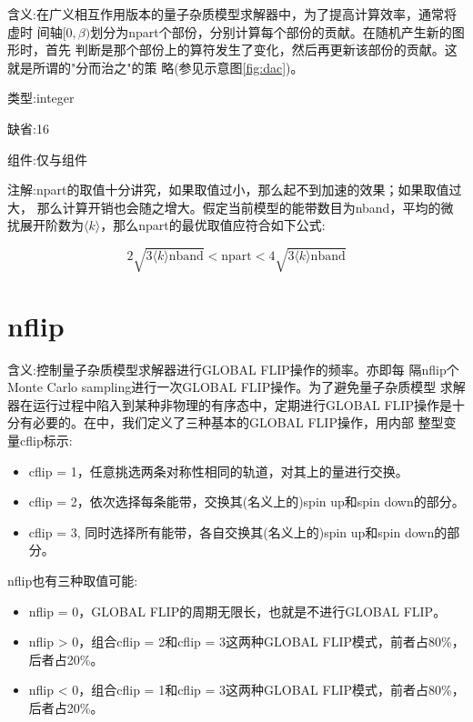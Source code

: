 {\color{red}含义}:在广义相互作用版本的量子杂质模型求解器中，为了提高计算效率，通常将虚时
间轴$[0,\beta)$划分为npart个部份，分别计算每个部份的贡献。在随机产生新的图形时，首先
判断是那个部份上的算符发生了变化，然后再更新该部份的贡献。这就是所谓的"分而治之"的策
略(参见示意图\ref{fig:dac})。

{\color{green}类型}:integer

{\color{blue}缺省}:16

{\color{brown}组件}:仅{\begonia}与{\lavender}组件

{\color{purple}注解}:npart的取值十分讲究，如果取值过小，那么起不到加速的效果；如果取值过大，
那么计算开销也会随之增大。假定当前模型的能带数目为nband，平均的微扰展开阶数为$\langle k 
\rangle$，那么npart的最优取值应符合如下公式:

\begin{equation}
2\sqrt{3 \langle k\rangle \text{nband}} < \text{npart} < 4\sqrt{3 \langle k \rangle \text{nband}}
\end{equation}

\section{nflip }
\label{sec:nflip}

{\color{red}含义}:控制量子杂质模型求解器进行GLOBAL FLIP操作的频率。亦即每
隔nflip个Monte Carlo sampling进行一次GLOBAL FLIP操作。为了避免量子杂质模型
求解器在运行过程中陷入到某种非物理的有序态中，定期进行GLOBAL FLIP操作是十
分有必要的。在{\iqist}中，我们定义了三种基本的GLOBAL FLIP操作，用内部
整型变量cflip标示:
\begin{itemize}
\item cflip = 1，任意挑选两条对称性相同的轨道，对其上的量进行交换。 
\item cflip = 2，依次选择每条能带，交换其(名义上的)spin up和spin down的部分。
\item cflip = 3, 同时选择所有能带，各自交换其(名义上的)spin up和spin down的部分。
\end{itemize}
nflip也有三种取值可能:
\begin{itemize}
\item nflip = 0，GLOBAL FLIP的周期无限长，也就是不进行GLOBAL FLIP。
\item nflip > 0，组合cflip = 2和cflip = 3这两种GLOBAL FLIP模式，前者占80\%，后者占20\%。
\item nflip < 0，组合cflip = 1和cflip = 3这两种GLOBAL FLIP模式，前者占80\%，后者占20\%。
\end{itemize}

